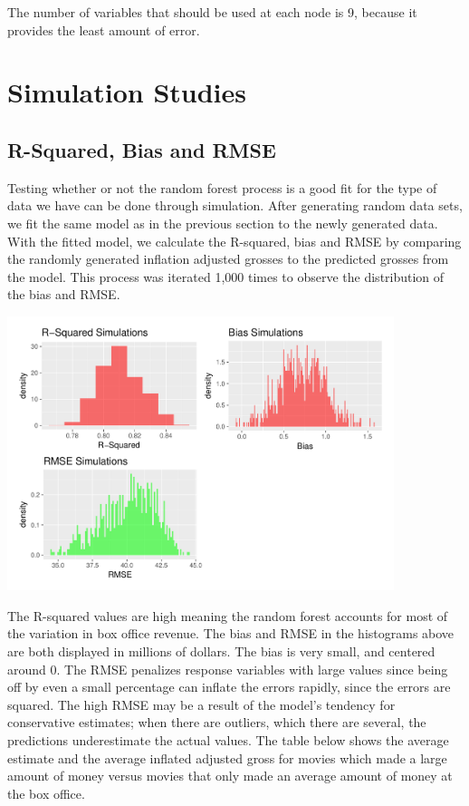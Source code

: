 \documentclass{svproc}
\begin{document}
The number of variables that should be used at each node is 9, because it provides the least amount of error.

\newpage
\section{Simulation Studies}

\subsection{R-Squared, Bias and RMSE}

Testing whether or not the random forest process is a good fit for the type of data we have can be done through simulation. After generating random data sets, we fit the same model as in the previous section to the newly generated data. With the fitted model, we calculate the R-squared, bias and RMSE by comparing the randomly generated inflation adjusted grosses to the predicted grosses from the model. This process was iterated 1,000 times to observe the distribution of the bias and RMSE.

\begin{center}
\includegraphics [height=8cm]{biasmse.pdf}
\end{center}

The R-squared values are high meaning the random forest accounts for most of the variation in box office revenue. The bias and RMSE in the histograms above are both displayed in millions of dollars. The bias is very small, and centered around 0. The RMSE penalizes response variables with large values since being off by even a small percentage can inflate the errors rapidly, since the errors are squared. The high RMSE may be a result of the model's tendency for conservative estimates; when there are outliers, which there are several, the predictions underestimate the actual values. The table below shows the average estimate and the average inflated adjusted gross for movies which made a large amount of money versus movies that only made an average amount of money at the box office.
\end{document}
